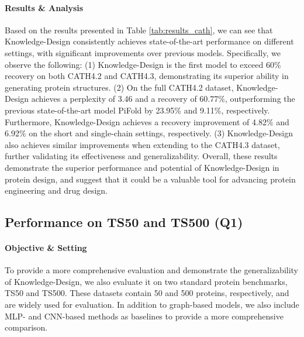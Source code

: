 \documentclass{article}
\begin{document}
\paragraph{Results \& Analysis} Based on the results presented in Table \ref{tab:results_cath}, we can see that Knowledge-Design consistently achieves state-of-the-art performance on different settings, with significant improvements over previous models. Specifically, we observe the following:
(1) Knowledge-Design is the first model to exceed 60\% recovery on both CATH4.2 and CATH4.3, demonstrating its superior ability in generating protein structures. (2) On the full CATH4.2 dataset, Knowledge-Design achieves a perplexity of 3.46 and a recovery of 60.77\%, outperforming the previous state-of-the-art model PiFold by 23.95\% and 9.11\%, respectively. Furthermore, Knowledge-Design achieves a recovery improvement of 4.82\% and 6.92\% on the short and single-chain settings, respectively. (3) Knowledge-Design also achieves similar improvements when extending to the CATH4.3 dataset, further validating its effectiveness and generalizability. Overall, these results demonstrate the superior performance and potential of Knowledge-Design in protein design, and suggest that it could be a valuable tool for advancing protein engineering and drug design.





\subsection{Performance on TS50 and TS500 (Q1)}
\paragraph{Objective \& Setting} To provide a more comprehensive evaluation and demonstrate the generalizability of Knowledge-Design, we also evaluate it on two standard protein benchmarks, TS50 and TS500. These datasets contain 50 and 500 proteins, respectively, and are widely used for evaluation. In addition to graph-based models, we also include MLP- and CNN-based methods as baselines to provide a more comprehensive comparison.
\end{document}
